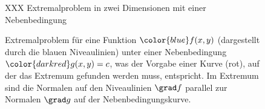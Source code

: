 %
%
%
\begin{figure}
\centering
\vspace*{2cm}
XXX Extremalproblem in zwei Dimensionen mit einer Nebenbedingung
\vspace*{2cm}
\caption{Extremalproblem für eine Funktion ${\color{blue}f(x,y)}$
(dargestellt durch
die {\color{blue}blauen} Niveaulinien) unter einer Nebenbedingung
${\color{darkred}g(x,y)=c}$, was der Vorgabe einer Kurve
({\color{darkred}rot}), auf der das Extremum gefunden werden muss,
entspricht.
Im Extremum sind die Normalen auf den Niveaulinien $\grad f$
parallel zur Normalen $\grad g$ auf der Nebenbedingungskurve.
\label{buch:fuvar:nebenbedingung:fig:nebenbedingung}}
\end{figure}

